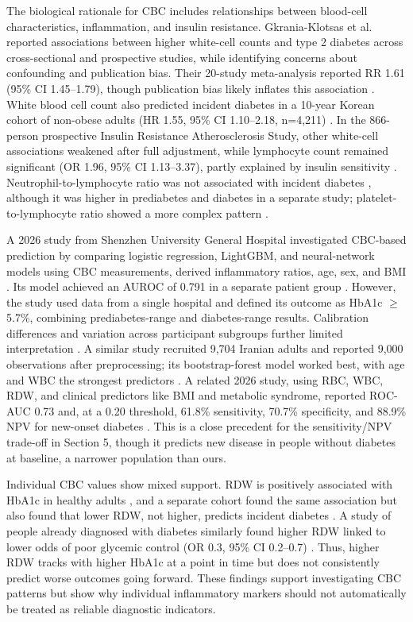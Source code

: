 \documentclass[conference]{IEEEtran}
\begin{document}
The biological rationale for CBC includes relationships between blood-cell characteristics, inflammation, and insulin resistance. Gkrania-Klotsas et al.\cite{gkrania2010} reported associations between higher white-cell counts and type 2 diabetes across cross-sectional and prospective studies, while identifying concerns about confounding and publication bias. Their 20-study meta-analysis reported RR 1.61 (95\% CI 1.45--1.79), though publication bias likely inflates this association \cite{gkrania2010}. White blood cell count also predicted incident diabetes in a 10-year Korean cohort of non-obese adults (HR 1.55, 95\% CI 1.10--2.18, n=4,211) \cite{park2021}. In the 866-person prospective Insulin Resistance Atherosclerosis Study, other white-cell associations weakened after full adjustment, while lymphocyte count remained significant (OR 1.96, 95\% CI 1.13--3.37), partly explained by insulin sensitivity \cite{lorenzo2014}. Neutrophil-to-lymphocyte ratio was not associated with incident diabetes \cite{lorenzo2014}, although it was higher in prediabetes and diabetes in a separate study; platelet-to-lymphocyte ratio showed a more complex pattern \cite{mertoglu2017}.


A 2026 study from Shenzhen University General Hospital investigated CBC-based prediction by comparing logistic regression, LightGBM, and neural-network models using CBC measurements, derived inflammatory ratios, age, sex, and BMI \cite{guo2026}. Its model achieved an AUROC of 0.791 in a separate patient group \cite{guo2026}. However, the study used data from a single hospital and defined its outcome as HbA1c \(\geq\)5.7\%, combining prediabetes-range and diabetes-range results. Calibration differences and variation across participant subgroups further limited interpretation \cite{guo2026}. A similar study recruited 9,704 Iranian adults and reported 9,000 observations after preprocessing; its bootstrap-forest model worked best, with age and WBC the strongest predictors \cite{mansoori2023}. A related 2026 study, using RBC, WBC, RDW, and clinical predictors like BMI and metabolic syndrome, reported ROC-AUC 0.73 and, at a 0.20 threshold, 61.8\% sensitivity, 70.7\% specificity, and 88.9\% NPV for new-onset diabetes \cite{kamkar2026}. This is a close precedent for the sensitivity/NPV trade-off in Section 5, though it predicts new disease in people without diabetes at baseline, a narrower population than ours.


Individual CBC values show mixed support. RDW is positively associated with HbA1c in healthy adults \cite{veeranna2012}, and a separate cohort found the same association but also found that lower RDW, not higher, predicts incident diabetes \cite{engstrom2014}. A study of people already diagnosed with diabetes similarly found higher RDW linked to lower odds of poor glycemic control (OR 0.3, 95\% CI 0.2--0.7) \cite{yin2018}. Thus, higher RDW tracks with higher HbA1c at a point in time but does not consistently predict worse outcomes going forward. These findings support investigating CBC patterns but show why individual inflammatory markers should not automatically be treated as reliable diagnostic indicators.
\end{document}
